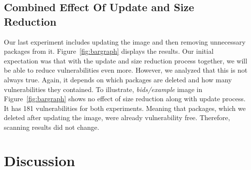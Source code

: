 \documentclass[a4paper,num-refs]{oup-contemporary}
\begin{document}
\subsection{Combined Effect Of Update and Size Reduction}

Our last experiment includes updating the image and then removing unnecessary packages from it.
Figure~\ref{fig:bargraph} displays the results. 
Our initial expectation was that with the update and size reduction process together, we will be able to
reduce vulnerabilities even more. However,
we analyzed that this is not always true. Again, it depends on which packages are deleted and how
many vulnerabilities they contained. To illustrate, \textit{bids/example} image in Figure~\ref{fig:bargraph}
shows no effect of size reduction along with update process. It has 181 vulnerabilities for both experiments.
Meaning that packages, which we deleted after updating the image, were already vulnerability free. Therefore,
scanning results did not change.
\vspace*{-2mm}
\section{Discussion}
\end{document}

